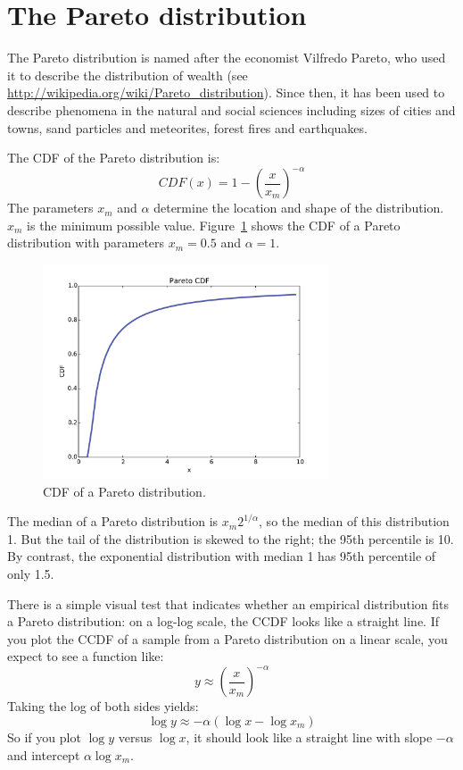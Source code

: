 \documentclass[12pt]{book}
\begin{document}
\section{The Pareto distribution}

The Pareto distribution is named after the economist Vilfredo Pareto,
who used it to describe the distribution of wealth (see
\url{http://wikipedia.org/wiki/Pareto_distribution}).  Since then, it has
been used to describe phenomena in the natural and social
sciences including sizes of cities and towns, sand particles and
meteorites, forest fires and earthquakes.

The CDF of the Pareto distribution is:
%
\[ CDF(x) = 1 - \left( \frac{x}{x_m} \right) ^{-\alpha} \]
%
The parameters $x_{m}$ and $\alpha$ determine the location and shape of
the distribution. $x_{m}$ is the minimum possible value.
Figure~\ref{pareto_cdf} shows the CDF of a Pareto distribution with
parameters $x_{m} = 0.5$ and $\alpha = 1$.

\begin{figure}
\centerline{\includegraphics[height=2.5in]{figs/pareto_cdf.pdf}}
\caption{CDF of a Pareto distribution.}
\label{pareto_cdf}
\end{figure}

The median of a Pareto distribution is $x_m 2^{1/\alpha}$, so the
median of this distribution 1.  But the tail of the distribution is
skewed to the right; the 95th percentile is 10.  By contrast, the
exponential distribution with median 1 has 95th percentile of only
1.5.  
  

There is a simple visual test that indicates whether an empirical
distribution fits a Pareto distribution: on a log-log scale, the CCDF
looks like a straight line.
If you plot the CCDF of a sample from a Pareto distribution on a
linear scale, you expect to see a function like:
%
\[ y \approx \left( \frac{x}{x_m} \right) ^{-\alpha} \]
%
Taking the log of both sides yields:
%
\[ \log y \approx -\alpha (\log x - \log x_{m})\]
%
So if you plot $\log y$ versus $\log x$, it should look like a straight
line with slope $-\alpha$ and intercept
$\alpha \log x_{m}$.
\end{document}
